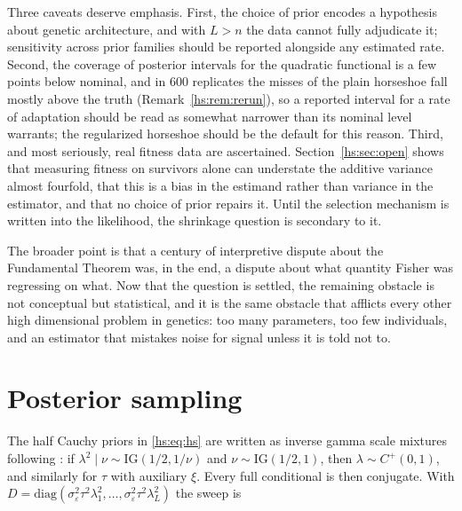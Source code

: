 Three caveats deserve emphasis. First, the choice of prior encodes a hypothesis about genetic architecture, and with $L>n$ the data cannot fully adjudicate it; sensitivity across prior families should be reported alongside any estimated rate. Second, the coverage of posterior intervals for the quadratic functional is a few points below nominal, and in $600$ replicates the misses of the plain horseshoe fall mostly above the truth (Remark~\ref{hs:rem:rerun}), so a reported interval for a rate of adaptation should be read as somewhat narrower than its nominal level warrants; the regularized horseshoe should be the default for this reason. Third, and most seriously, real fitness data are ascertained. Section~\ref{hs:sec:open} shows that measuring fitness on survivors alone can understate the additive variance almost fourfold, that this is a bias in the estimand rather than variance in the estimator, and that no choice of prior repairs it. Until the selection mechanism is written into the likelihood, the shrinkage question is secondary to it.

The broader point is that a century of interpretive dispute about the Fundamental Theorem was, in the end, a dispute about what quantity Fisher was regressing on what. Now that the question is settled, the remaining obstacle is not conceptual but statistical, and it is the same obstacle that afflicts every other high dimensional problem in genetics: too many parameters, too few individuals, and an estimator that mistakes noise for signal unless it is told not to.




\section{Posterior sampling}
\label{hs:app:gibbs}

The half Cauchy priors in \eqref{hs:eq:hs} are written as inverse gamma scale mixtures following \citet{hs:makalic2016simple}: if $\lambda^2 \mid \nu \sim \mathrm{IG}(1/2, 1/\nu)$ and $\nu \sim \mathrm{IG}(1/2,1)$, then $\lambda \sim C^{+}(0,1)$, and similarly for $\tau$ with auxiliary $\xi$. Every full conditional is then conjugate. With $D = \mathrm{diag}(\sigma^2_\varepsilon \tau^2\lambda_1^2,\ldots,\sigma^2_\varepsilon\tau^2\lambda_L^2)$ the sweep is

